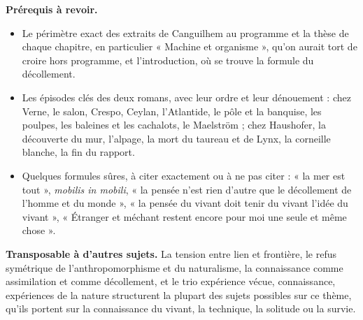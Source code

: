 \documentclass[11pt,a4paper]{article}
\providecommand{\tightlist}{\setlength{\itemsep}{0pt}\setlength{\parskip}{0pt}}
\begin{document}
\textbf{Prérequis à revoir.}

\begin{itemize}
\tightlist
\item
  Le périmètre exact des extraits de Canguilhem au programme et la thèse de chaque chapitre, en particulier « Machine et organisme », qu'on aurait tort de croire hors programme, et l'introduction, où se trouve la formule du décollement.
\item
  Les épisodes clés des deux romans, avec leur ordre et leur dénouement : chez Verne, le salon, Crespo, Ceylan, l'Atlantide, le pôle et la banquise, les poulpes, les baleines et les cachalots, le Maelström ; chez Haushofer, la découverte du mur, l'alpage, la mort du taureau et de Lynx, la corneille blanche, la fin du rapport.
\item
  Quelques formules sûres, à citer exactement ou à ne pas citer : « la mer est tout », \emph{mobilis in mobili}, « la pensée n'est rien d'autre que le décollement de l'homme et du monde », « la pensée du vivant doit tenir du vivant l'idée du vivant », « Étranger et méchant restent encore pour moi une seule et même chose ».
\end{itemize}

\textbf{Transposable à d'autres sujets.} La tension entre lien et frontière, le refus symétrique de l'anthropomorphisme et du naturalisme, la connaissance comme assimilation et comme décollement, et le trio expérience vécue, connaissance, expériences de la nature structurent la plupart des sujets possibles sur ce thème, qu'ils portent sur la connaissance du vivant, la technique, la solitude ou la survie.
\end{document}
